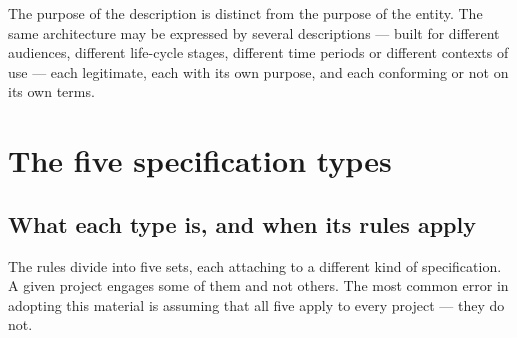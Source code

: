 \documentclass[11pt,a4paper]{report}
\begin{document}
The purpose of the description is distinct from the purpose of the entity. The
same architecture may be expressed by several descriptions --- built for
different audiences, different life-cycle stages, different time periods or
different contexts of use --- each legitimate, each with its own purpose, and
each conforming or not on its own terms.

\chapter{The five specification types}

\section{What each type is, and when its rules apply}

The rules divide into five sets, each attaching to a different kind of
specification. A given project engages some of them and not others. The most
common error in adopting this material is assuming that all five apply to every
project --- they do not.
\end{document}
